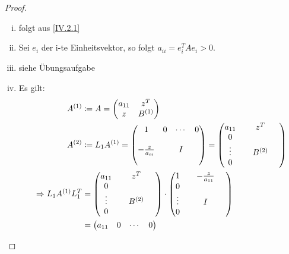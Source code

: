 \documentclass[ngerman,fontsize=11pt, paper=a4, parskip=half, titlepage=true, toc=bib]{scrbook}
\begin{document}
  \begin{proof}~\\
    \begin{enumerate}[i)]
    \item folgt aus \eqref{IV.2.1}
    \item Sei $e_i$ der i-te Einheitsvektor, so folgt $a_{ii} = e_{i}^TAe_i > 0$.
    \item siehe Übungsaufgabe
    \item Es gilt:
      \begin{align*}
        A^{(1)} &\coloneqq A = \begin{pmatrix}
          a_{11} & z^T \\ 
          z			& B^{(1)}
        \end{pmatrix} \\
        A^{(2)}	&\coloneqq L_1 A^{(1)} 
                  = \begin{pmatrix}
                    1 & 0 & \dotsm & 0 \\ \\
                    -\frac{z}{a_{ii}} && I \\ ~
                  \end{pmatrix} 
        = \begin{pmatrix}
          a_{11} &  & z^T & ~ \\ 
          0 \\
          \vdots && B^{(2)} \\ 
          0
        \end{pmatrix} \\
        \Rightarrow L_1A^{(1)}L_1^T  
                &= \begin{pmatrix}
                  a_{11} &  & z^T & ~ \\ 
                  0 \\
                  \vdots && B^{(2)} \\ 
                  0
                \end{pmatrix} 
        \cdot  \begin{pmatrix}
          1 &  &	-\frac{z}{a_{11}} & ~ \\ 
          0 \\\nocite{*}
          \vdots && I \\ 
          0
        \end{pmatrix}\\
                &= \begin{pmatrix}
                  a_{11} & 0 & \cdots & 0\\ 

\end{pmatrix}
\end{align*}
\end{enumerate}
\end{proof}
\end{document}
